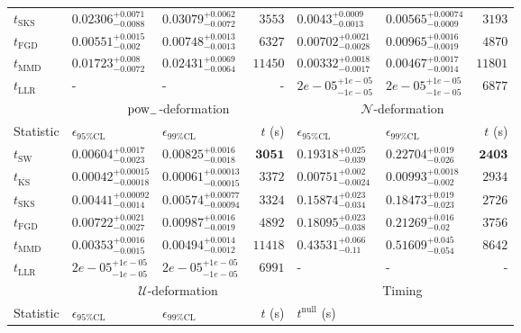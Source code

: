 \begin{tabular}{l|llr|llr}
	$t_{\mathrm{SKS}}$ & $0.02306_{-0.0088}^{+0.0071}$ & $0.03079_{-0.0072}^{+0.0062}$ & $3553$ & $0.0043_{-0.0013}^{+0.0009}$ & $0.00565_{-0.0009}^{+0.00074}$ & $3193$ \\
	$t_{\mathrm{FGD}}$ & ${\mathbf{0.00551_{-0.002}^{+0.0015}}}$ & ${\mathbf{0.00748_{-0.0013}^{+0.0013}}}$ & $6327$ & $0.00702_{-0.0028}^{+0.0021}$ & $0.00965_{-0.0019}^{+0.0016}$ & $4870$ \\
	$t_{\mathrm{MMD}}$ & $0.01723_{-0.0072}^{+0.008}$ & $0.02431_{-0.0064}^{+0.0069}$ & $11450$ & $0.00332_{-0.0017}^{+0.0018}$ & $0.00467_{-0.0014}^{+0.0017}$ & $11801$ \\
	$t_{\mathrm{LLR}}$ & - & - & - & $2e-05_{-1e-05}^{+1e-05}$ & $2e-05_{-1e-05}^{+1e-05}$ & $6877$ \\
	\toprule
	\multicolumn{1}{c}{} & \multicolumn{3}{c}{$\rm{pow}_{-}$-deformation} & \multicolumn{3}{c}{$\mathcal{N}$-deformation} \\
	Statistic & $\epsilon_{95\%\mathrm{CL}}$ & $\epsilon_{99\%\mathrm{CL}}$ & $t$ (s) & $\epsilon_{95\%\mathrm{CL}}$ & $\epsilon_{99\%\mathrm{CL}}$ & $t$ (s) \\
	\midrule
	$t_{\mathrm{SW}}$ & $0.00604_{-0.0023}^{+0.0017}$ & $0.00825_{-0.0018}^{+0.0016}$ & ${\mathbf{3051}}$ & $0.19318_{-0.039}^{+0.025}$ & $0.22704_{-0.026}^{+0.019}$ & ${\mathbf{2403}}$ \\
	$t_{\overline{\mathrm{KS}}}$ & ${\mathbf{0.00042_{-0.00018}^{+0.00015}}}$ & ${\mathbf{0.00061_{-0.00015}^{+0.00013}}}$ & $3372$ & ${\mathbf{0.00751_{-0.0024}^{+0.002}}}$ & ${\mathbf{0.00993_{-0.002}^{+0.0018}}}$ & $2934$ \\
	$t_{\mathrm{SKS}}$ & $0.00441_{-0.0014}^{+0.00092}$ & $0.00574_{-0.00094}^{+0.00077}$ & $3324$ & $0.15874_{-0.034}^{+0.023}$ & $0.18473_{-0.023}^{+0.019}$ & $2726$ \\
	$t_{\mathrm{FGD}}$ & $0.00722_{-0.0027}^{+0.0021}$ & $0.00987_{-0.0019}^{+0.0016}$ & $4892$ & $0.18095_{-0.038}^{+0.023}$ & $0.21269_{-0.02}^{+0.016}$ & $3756$ \\
	$t_{\mathrm{MMD}}$ & $0.00353_{-0.0015}^{+0.0016}$ & $0.00494_{-0.0012}^{+0.0014}$ & $11418$ & $0.43531_{-0.11}^{+0.066}$ & $0.51609_{-0.054}^{+0.045}$ & $8642$ \\
	$t_{\mathrm{LLR}}$ & $2e-05_{-1e-05}^{+1e-05}$ & $2e-05_{-1e-05}^{+1e-05}$ & $6991$ & - & - & - \\
	\toprule
	\multicolumn{1}{c}{} & \multicolumn{3}{c}{$\mathcal{U}$-deformation} & \multicolumn{3}{c}{Timing} \\
	Statistic & $\epsilon_{95\%\mathrm{CL}}$ & $\epsilon_{99\%\mathrm{CL}}$ & $t$ (s) & $t^{\mathrm{null}}$ (s) \\

\end{tabular}

